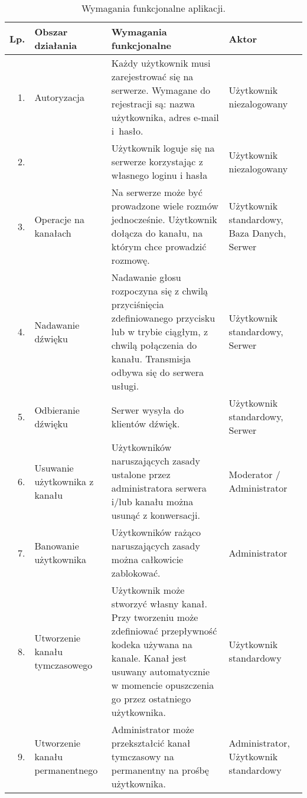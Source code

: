 \begin{longtabu} to 
	\caption{Wymagania funkcjonalne aplikacji.}
	\label{tab:wymfun} \\
	
	\hline
	\rowfont\bfseries Lp. & Obszar działania & Wymagania funkcjonalne & Aktor \\ \hline
	\endhead
	\endfoot
	\endlastfoot

	1.&
	Autoryzacja &
	Każdy użytkownik musi zarejestrować się na serwerze. Wymagane do
	rejestracji są: nazwa użytkownika, adres e-mail i~hasło. &
	Użytkownik niezalogowany \\  
	
	2.&
	&
	Użytkownik loguje się na serwerze korzystając z własnego loginu i hasła &
	Użytkownik niezalogowany\\ \hline
	
	3.&
	Operacje na kanałach &
	Na serwerze może być prowadzone wiele rozmów jednocześnie. Użytkownik
	dołącza do kanału, na którym chce prowadzić rozmowę. &
	Użytkownik standardowy, Baza Danych, Serwer\\ \hline
	
	4.&
	Nadawanie dźwięku &
	Nadawanie głosu rozpoczyna się z chwilą przyciśnięcia zdefiniowanego
	przycisku lub w trybie ciągłym, z chwilą połączenia do kanału. Transmisja
	odbywa się do serwera usługi. &
	Użytkownik standardowy, Serwer\\ \hline
	
	5.&
	Odbieranie dźwięku & Serwer wysyła do klientów dźwięk. &
	Użytkownik standardowy, Serwer\\ \hline
	
	6.&
	Usuwanie użytkownika z kanału & Użytkowników naruszających zasady ustalone
	przez administratora serwera i/lub kanału można usunąć z konwersacji. &
	Moderator / Administrator\\ \hline
	
	7.&
	Banowanie użytkownika &
	Użytkowników rażąco naruszających zasady można całkowicie zablokować. &
	Administrator\\ \hline
	
	8.&
	Utworzenie kanału tymczasowego &
	Użytkownik może stworzyć własny kanał. Przy tworzeniu może zdefiniować
	przepływność kodeka używana na kanale. Kanał jest usuwany automatycznie w
	momencie opuszczenia go przez ostatniego użytkownika. &
	Użytkownik standardowy\\ \hline
	
	9.&
	Utworzenie kanału permanentnego &
	Administrator może przekształcić kanał tymczasowy na permanentny na prośbę
	użytkownika. &
	Administrator, Użytkownik standardowy \\ \hline
\end{longtabu}
